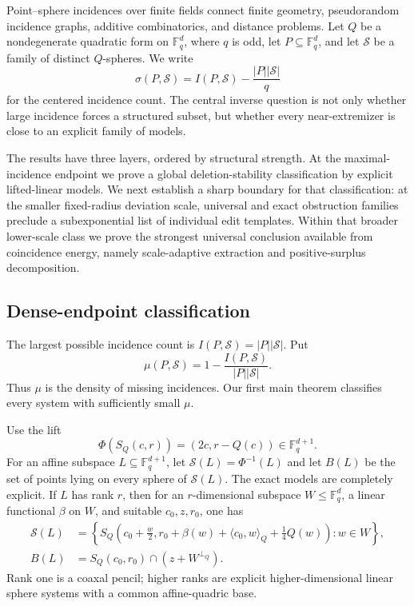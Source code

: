\documentclass[11pt,letterpaper]{amsart}
\theoremstyle{definition}
\theoremstyle{remark}
\newcommand{\1}{\mathbf 1}
\begin{document}
Point--sphere incidences over finite fields connect finite geometry, pseudorandom incidence graphs, additive combinatorics, and distance problems.  Let $Q$ be a nondegenerate quadratic form on $\mathbb F_q^d$, where $q$ is odd, let $P\subseteq\mathbb F_q^d$, and let $\mathcal S$ be a family of distinct $Q$-spheres.  We write
\[
 \sigma(P,\mathcal S)=I(P,\mathcal S)-\frac{|P||\mathcal S|}{q}
\]
for the centered incidence count.  The central inverse question is not only whether large incidence forces a structured subset, but whether every near-extremizer is close to an explicit family of models.

The results have three layers, ordered by structural strength.  At the maximal-incidence endpoint we prove a global deletion-stability classification by explicit lifted-linear models.  We next establish a sharp boundary for that classification: at the smaller fixed-radius deviation scale, universal and exact obstruction families preclude a subexponential list of individual edit templates.  Within that broader lower-scale class we prove the strongest universal conclusion available from coincidence energy, namely scale-adaptive extraction and positive-surplus decomposition.

\subsection{Dense-endpoint classification}

The largest possible incidence count is $I(P,\mathcal S)=|P||\mathcal S|$.  Put
\[
 \mu(P,\mathcal S)=1-\frac{I(P,\mathcal S)}{|P||\mathcal S|}.
\]
Thus $\mu$ is the density of missing incidences.  Our first main theorem classifies every system with sufficiently small $\mu$.

Use the lift
\[
 \Phi(S_Q(c,r))=(2c,r-Q(c))\in\mathbb F_q^{d+1}.
\]
For an affine subspace $L\subseteq\mathbb F_q^{d+1}$, let $\mathcal S(L)=\Phi^{-1}(L)$ and let $B(L)$ be the set of points lying on every sphere of $\mathcal S(L)$.  The exact models are completely explicit.  If $L$ has rank $r$, then for an $r$-dimensional subspace $W\le\mathbb F_q^d$, a linear functional $\beta$ on $W$, and suitable $c_0,z,r_0$, one has
\begin{align*}
 \mathcal S(L)
 &=\left\{S_Q\left(c_0+\frac w2,
 r_0+\beta(w)+\langle c_0,w\rangle_Q+\frac14Q(w)\right):w\in W\right\},\\
 B(L)&=S_Q(c_0,r_0)\cap(z+W^{\perp_Q}).
\end{align*}
Rank one is a coaxal pencil; higher ranks are explicit higher-dimensional linear sphere systems with a common affine-quadric base.
\end{document}
